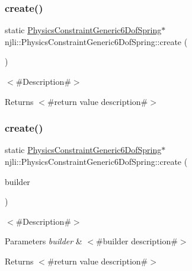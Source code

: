 \subsubsection{\texorpdfstring{create()}{create()}\hspace{0.1cm}{\footnotesize\ttfamily [1/2]}}
{\footnotesize\ttfamily static \mbox{\hyperlink{classnjli_1_1_physics_constraint_generic6_dof_spring}{Physics\+Constraint\+Generic6\+Dof\+Spring}}$\ast$ njli\+::\+Physics\+Constraint\+Generic6\+Dof\+Spring\+::create (\begin{DoxyParamCaption}{ }\end{DoxyParamCaption})\hspace{0.3cm}{\ttfamily [static]}}

$<$\#\+Description\#$>$

\begin{DoxyReturn}{Returns}
$<$\#return value description\#$>$ 
\end{DoxyReturn}
\mbox{\label{classnjli_1_1_physics_constraint_generic6_dof_spring_abdf988521a32e8f90555412f5521adf7}} 
\subsubsection{\texorpdfstring{create()}{create()}\hspace{0.1cm}{\footnotesize\ttfamily [2/2]}}
{\footnotesize\ttfamily static \mbox{\hyperlink{classnjli_1_1_physics_constraint_generic6_dof_spring}{Physics\+Constraint\+Generic6\+Dof\+Spring}}$\ast$ njli\+::\+Physics\+Constraint\+Generic6\+Dof\+Spring\+::create (\begin{DoxyParamCaption}\item[{const \mbox{\hyperlink{classnjli_1_1_physics_constraint_generic6_dof_spring_builder}{Physics\+Constraint\+Generic6\+Dof\+Spring\+Builder}} \&}]{builder }\end{DoxyParamCaption})\hspace{0.3cm}{\ttfamily [static]}}

$<$\#\+Description\#$>$


\begin{DoxyParams}{Parameters}
{\em builder} & $<$\#builder description\#$>$\\
\hline
\end{DoxyParams}
\begin{DoxyReturn}{Returns}
$<$\#return value description\#$>$ 
\end{DoxyReturn}
\mbox{\label{classnjli_1_1_physics_constraint_generic6_dof_spring_a1cd2d7b1a7bb8ef56286e178c95f99e7}} 
